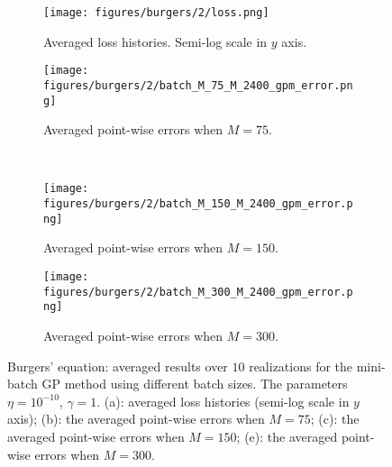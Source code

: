 \documentclass[10pt,reqno]{amsart}
\newcommand{\1}{{\chi}}
\numberwithin{equation}{section}
\theoremstyle{thmlemcorr}
\numberwithin{theorem}{section}
\theoremstyle{thmlemcorr*}
\theoremstyle{defi}
\theoremstyle{remexample}
\theoremstyle{ass}
\begin{document}
\begin{figure}[!hbtbp]
	\centering          
	\begin{subfigure}[b]{0.3\textwidth}
		\texttt{[image: figures/burgers/2/loss.png]}
		\caption{Averaged loss histories. Semi-log scale in $y$ axis.}
		\label{fig:burgers:avgls}
	\end{subfigure} 
	\begin{subfigure}[b]{0.3\textwidth}
		\texttt{[image: figures/burgers/2/batch\_M\_75\_M\_2400\_gpm\_error.png]}
		\caption{Averaged point-wise errors when $M=75$.}
		\label{fig:burgers:avger12}
	\end{subfigure} \\
	\begin{subfigure}[b]{0.325\textwidth}
		\texttt{[image: figures/burgers/2/batch\_M\_150\_M\_2400\_gpm\_error.png]}
		\caption{Averaged point-wise errors when $M=150$.}
		\label{fig:burgers:avger24}
	\end{subfigure} 
	\begin{subfigure}[b]{0.3\textwidth}
		\texttt{[image: figures/burgers/2/batch\_M\_300\_M\_2400\_gpm\_error.png]}
		\caption{Averaged point-wise errors when $M=300$.}
		\label{fig:burgers:avger48}
	\end{subfigure} 
	\caption{Burgers' equation: averaged results over $10$ realizations for the mini-batch GP method using different batch sizes. The parameters $\eta=10^{-10}$, $\gamma=1$. (a): averaged loss histories (semi-log scale in $y$ axis); (b): the averaged point-wise errors when $M=75$; (c): the averaged point-wise errors when $M=150$; (e): the averaged point-wise errors when $M=300$. }
	\label{fig:burgers:2}
\end{figure}
\end{document}
